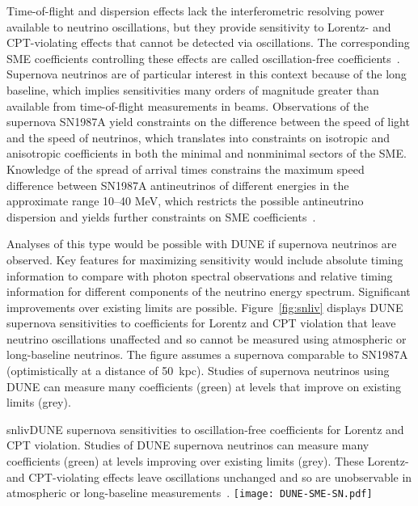 Time-of-flight and dispersion effects lack the interferometric resolving power available to neutrino oscillations, but they provide sensitivity to Lorentz- and CPT-violating effects that cannot be detected via oscillations. The corresponding SME coefficients controlling these effects are called oscillation-free coefficients~\cite{Kostelecky:2011gq}.
Supernova neutrinos are of particular interest in this context because of the long baseline, which implies sensitivities many orders of magnitude greater than available from time-of-flight measurements in beams. Observations of the supernova SN1987A yield constraints on the difference between the speed of light and the speed of neutrinos, which translates into constraints on isotropic and anisotropic coefficients in both the minimal and nonminimal sectors of the SME. Knowledge of the spread of arrival times constrains the maximum speed difference between SN1987A antineutrinos of different energies in the approximate range 10--40 MeV, which restricts the possible antineutrino dispersion and yields further constraints on SME coefficients~\cite{Kostelecky:2011gq}.

Analyses of this type would be possible with DUNE if supernova neutrinos are observed. Key features for maximizing sensitivity would include absolute timing information to compare with photon spectral observations and relative timing information for different components of the neutrino energy spectrum. Significant improvements over existing limits are possible.
Figure~\ref{fig:snliv} displays DUNE supernova sensitivities to coefficients for Lorentz and CPT violation that leave neutrino oscillations unaffected and so cannot be measured using atmospheric or long-baseline neutrinos. The figure assumes a supernova comparable to SN1987A (optimistically at a distance of 50~kpc). Studies of supernova neutrinos using DUNE can measure many coefficients (green) at levels that improve on existing limits (grey).


\begin{cdrfigure}{snliv}{DUNE supernova sensitivities to oscillation-free coefficients for Lorentz and CPT violation. Studies of DUNE supernova neutrinos can measure many coefficients (green) at levels improving over existing limits (grey). These Lorentz- and CPT-violating effects leave oscillations unchanged and so are unobservable in atmospheric or long-baseline measurements~\cite{kostelecky}.}
\texttt{[image: DUNE-SME-SN.pdf]}
\end{cdrfigure}

